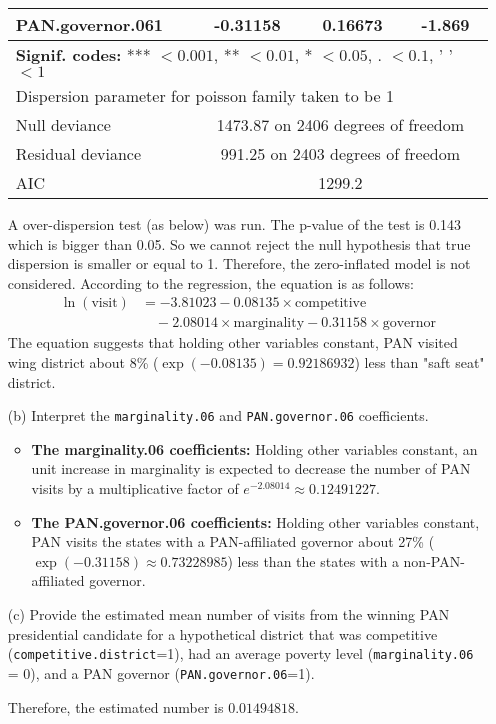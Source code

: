 \documentclass[12pt,letterpaper]{article}
\begin{document}
\begin{enumerate}
\begin{table}[htbp]
\begin{tabular}{lccc}
			PAN.governor.061 & -0.31158 & 0.16673 & -1.869 \\
			\midrule
			\multicolumn{4}{l}{\textbf{Signif. codes:} *** $<0.001$, ** $<0.01$, * $<0.05$, . $<0.1$, ' ' $<1$} \\
			\midrule
			\multicolumn{4}{l}{Dispersion parameter for poisson family taken to be 1} \\
			\midrule
			Null deviance & \multicolumn{3}{c}{1473.87 on 2406 degrees of freedom} \\
			Residual deviance & \multicolumn{3}{c}{991.25 on 2403 degrees of freedom} \\
			AIC & \multicolumn{3}{c}{1299.2} \\
			\bottomrule
		\end{tabular}
		\label{tab:poisson_regression_results}
	\end{table}
A over-dispersion test (as below) was run. The p-value of the test is 0.143 which is bigger than 0.05. So we cannot reject the null hypothesis that true dispersion is smaller or equal to 1. Therefore, the zero-inflated model is not considered. According to the regression, the equation is as follows:
\begin{align*}
	\ln(\text{visit}) &= -3.81023 - 0.08135 \times \text{competitive} \\
	&\quad - 2.08014 \times \text{marginality} - 0.31158 \times \text{governor}
\end{align*}
The equation suggests that holding other variables constant, PAN visited wing district about 8\% ($\exp(-0.08135)=0.92186932$) less than "saft seat" district.

	\vspace{5 cm}
	\item [(b)]
	Interpret the \texttt{marginality.06} and \texttt{PAN.governor.06} coefficients.
	
	\begin{itemize}
		\item \textbf{The marginality.06 coefficients:} Holding other variables constant, an unit increase in marginality is expected to decrease the number of PAN visits by a multiplicative factor of $e^{-2.08014} \approx 0.12491227$.
		
		\item \textbf{The PAN.governor.06 coefficients:} Holding other variables constant, PAN visits the states with a PAN-affiliated governor about 27\% ($\exp(-0.31158) \approx 0.73228985$) less than the states with a non-PAN-affiliated governor.
	\end{itemize}
	
	
	
	\item [(c)]
	Provide the estimated mean number of visits from the winning PAN presidential candidate for a hypothetical district that was competitive (\texttt{competitive.district}=1), had an average poverty level (\texttt{marginality.06} = 0), and a PAN governor (\texttt{PAN.governor.06}=1).
	
		 
		Therefore, the estimated number is $0.01494818$.
		
	
\end{enumerate}
\end{document}

